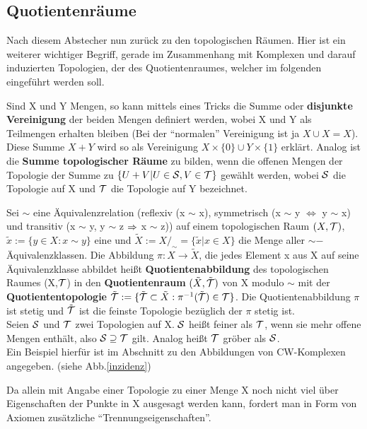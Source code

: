 \subsection{Quotientenräume}

Nach diesem Abstecher nun zurück zu den topologischen Räumen. Hier ist
ein weiterer wichtiger Begriff, gerade im Zusammenhang mit Komplexen und
darauf induzierten Topologien, der des Quotientenraumes, welcher im folgenden
eingeführt werden soll.

Sind X und Y Mengen, so kann mittels eines Tricks die Summe oder {\bf disjunkte
Vereinigung} der beiden
Mengen definiert werden, wobei X und Y als Teilmengen erhalten bleiben
(Bei der "`normalen"' Vereinigung ist ja $X\cup X = X$).
Diese Summe $X+Y$ wird so als Vereinigung $X\times \{0\} \cup Y\times \{1\}$
erklärt. Analog ist die {\bf Summe topologischer Räume} zu bilden,
wenn die offenen Mengen der Topologie der Summe zu
$\{U+V|U\in{\cal S},V\in{\cal T}\}$ gewählt werden, wobei ${\cal S}$ die Topologie auf X und
${\cal T}$ die Topologie auf Y bezeichnet.

Sei $\sim$ eine Äquivalenzrelation (reflexiv (x $\sim$ x), symmetrisch
(x $\sim$ y $\iff$ y $\sim$ x) und transitiv (x $\sim$ y, y $\sim$ z
$\Rightarrow$ x $\sim$ z)) auf einem topologischen Raum $(X,{\cal T})$,
$\tilde{x}:=\{y\in X:x\sim y\}$ eine und $\tilde{X}:=X/_\sim =
\{\tilde{x}|x\in X\}$ die Menge aller $\sim-$Äquivalenzklassen. Die Abbildung
$\pi:X\to\tilde{X}$, die jedes Element x aus X auf seine Äquivalenzklasse
abbildet heißt {\bf Quotientenabbildung} des
topologischen Raumes (X,${\cal T}$) in den {\bf Quotientenraum}
$(\tilde{X},\tilde{{\cal T}})$  von X modulo $\sim$ mit der
{\bf Quotiententopologie}  $\tilde{{\cal T}} :=
\{\tilde{{\cal T}}\subset\tilde{X}:\pi^{-1}(\tilde{{\cal T}})\in{\cal T}\}$.
Die Quotientenabbildung $\pi$ ist stetig und $\tilde{{\cal T}}$ ist die feinste
Topologie bezüglich der $\pi$ stetig ist.\\
{\scsi
Seien ${\cal S}$ und ${\cal T}$ zwei Topologien auf X. ${\cal S}$ heißt feiner als ${\cal T}$,
wenn sie mehr offene Mengen enthält, also ${\cal S}\supseteq{\cal T}$ gilt. Analog
heißt ${\cal T}$ gröber als ${\cal S}$.
}\\
Ein Beispiel hierfür ist im Abschnitt zu den Abbildungen von CW-Komplexen
angegeben. (siehe Abb.\ref{inzidenz})

Da allein mit Angabe einer Topologie zu einer Menge X noch nicht viel
über Eigenschaften der Punkte in X ausgesagt werden kann, fordert man
in Form von Axiomen zusätzliche "`Trennungseigenschaften"'.

